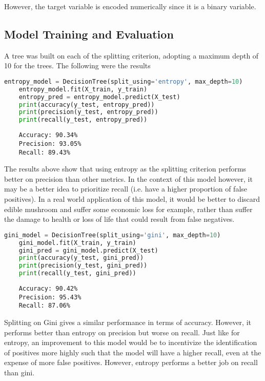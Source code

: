 \documentclass{article}
\begin{document}
However, the target variable is encoded numerically since it is a binary variable.

\subsection{Model Training and Evaluation}

A tree was built on each of the splitting criterion, adopting a maximum depth of 10 for the trees. 
The following were the results

\begin{lstlisting}[language=Python, caption=Entropy Tree]
    entropy_model = DecisionTree(split_using='entropy', max_depth=10)
    entropy_model.fit(X_train, y_train)
    entropy_pred = entropy_model.predict(X_test)
    print(accuracy(y_test, entropy_pred))
    print(precision(y_test, entropy_pred))
    print(recall(y_test, entropy_pred))
\end{lstlisting}

\begin{lstlisting}
    Accuracy: 90.34%
    Precision: 93.05%
    Recall: 89.43%
\end{lstlisting}
The results above show that using entropy as the splitting criterion performs better on precision than other metrics. In the context of this model however, it may be a better idea to prioritize recall (i.e. have a higher proportion of false positives). In a real world application of this model, it would be better to discard edible mushroom and suffer some economic loss for example, rather than suffer the damage to health or loss of life that could result from false negatives.

\begin{lstlisting}[language=Python, caption=Gini Tree]
    gini_model = DecisionTree(split_using='gini', max_depth=10)
    gini_model.fit(X_train, y_train)
    gini_pred = gini_model.predict(X_test)
    print(accuracy(y_test, gini_pred))
    print(precision(y_test, gini_pred))
    print(recall(y_test, gini_pred))
\end{lstlisting}

\begin{lstlisting}
    Accuracy: 90.42%
    Precision: 95.43%
    Recall: 87.06%
\end{lstlisting}

Splitting on Gini gives a similar performance in terms of accuracy. However, it performs better than entropy on precision but worse on recall. Just like for entropy, an improvement to this model would be to incentivize the identification of positives more highly such that the model will have a higher recall, even at the expense of more false positives. However, entropy performs a better job on recall than gini. 
\end{document}
